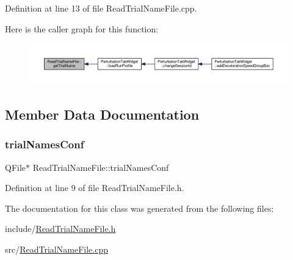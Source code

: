 Definition at line 13 of file Read\+Trial\+Name\+File.\+cpp.

Here is the caller graph for this function\+:
\nopagebreak
\begin{figure}[H]
\begin{center}
\leavevmode
\includegraphics[width=350pt]{class_read_trial_name_file_ac2baefe73463ab4de88b3bc4ab0fbc23_icgraph}
\end{center}
\end{figure}


\subsection{Member Data Documentation}
\mbox{\label{class_read_trial_name_file_a8b35e16abc1e8f102a6a8ffaec80e174}} 
\subsubsection{\texorpdfstring{trial\+Names\+Conf}{trialNamesConf}}
{\footnotesize\ttfamily Q\+File$\ast$ Read\+Trial\+Name\+File\+::trial\+Names\+Conf}



Definition at line 9 of file Read\+Trial\+Name\+File.\+h.



The documentation for this class was generated from the following files\+:\begin{DoxyCompactItemize}
\item 
include/\hyperlink{_read_trial_name_file_8h}{Read\+Trial\+Name\+File.\+h}\item 
src/\hyperlink{_read_trial_name_file_8cpp}{Read\+Trial\+Name\+File.\+cpp}\end{DoxyCompactItemize}
